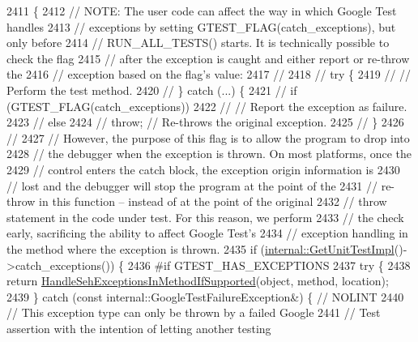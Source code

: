 \begin{DoxyCode}
2411                                                           \{
2412   \textcolor{comment}{// NOTE: The user code can affect the way in which Google Test handles}
2413   \textcolor{comment}{// exceptions by setting GTEST\_FLAG(catch\_exceptions), but only before}
2414   \textcolor{comment}{// RUN\_ALL\_TESTS() starts. It is technically possible to check the flag}
2415   \textcolor{comment}{// after the exception is caught and either report or re-throw the}
2416   \textcolor{comment}{// exception based on the flag's value:}
2417   \textcolor{comment}{//}
2418   \textcolor{comment}{// try \{}
2419   \textcolor{comment}{//   // Perform the test method.}
2420   \textcolor{comment}{// \} catch (...) \{}
2421   \textcolor{comment}{//   if (GTEST\_FLAG(catch\_exceptions))}
2422   \textcolor{comment}{//     // Report the exception as failure.}
2423   \textcolor{comment}{//   else}
2424   \textcolor{comment}{//     throw;  // Re-throws the original exception.}
2425   \textcolor{comment}{// \}}
2426   \textcolor{comment}{//}
2427   \textcolor{comment}{// However, the purpose of this flag is to allow the program to drop into}
2428   \textcolor{comment}{// the debugger when the exception is thrown. On most platforms, once the}
2429   \textcolor{comment}{// control enters the catch block, the exception origin information is}
2430   \textcolor{comment}{// lost and the debugger will stop the program at the point of the}
2431   \textcolor{comment}{// re-throw in this function -- instead of at the point of the original}
2432   \textcolor{comment}{// throw statement in the code under test.  For this reason, we perform}
2433   \textcolor{comment}{// the check early, sacrificing the ability to affect Google Test's}
2434   \textcolor{comment}{// exception handling in the method where the exception is thrown.}
2435   \textcolor{keywordflow}{if} (\hyperlink{namespacetesting_1_1internal_a9bd0caf5d16512de38b39599c13ee634}{internal::GetUnitTestImpl}()->catch\_exceptions()) \{
2436 \textcolor{preprocessor}{#if GTEST\_HAS\_EXCEPTIONS}
2437     \textcolor{keywordflow}{try} \{
2438       \textcolor{keywordflow}{return} \hyperlink{namespacetesting_1_1internal_ac5293b438139ef7ed05cb7fcaaf63545}{HandleSehExceptionsInMethodIfSupported}(\textcolor{keywordtype}{object}, method, 
      location);
2439     \} \textcolor{keywordflow}{catch} (\textcolor{keyword}{const} internal::GoogleTestFailureException&) \{  \textcolor{comment}{// NOLINT}
2440       \textcolor{comment}{// This exception type can only be thrown by a failed Google}
2441       \textcolor{comment}{// Test assertion with the intention of letting another testing}

\end{DoxyCode}
